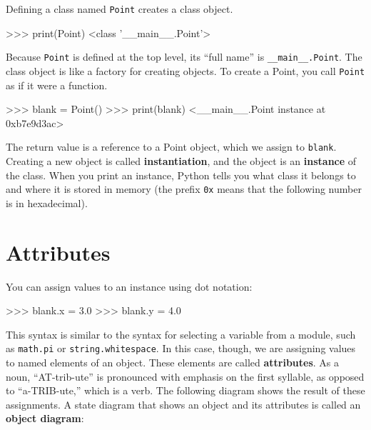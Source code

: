 
Defining a class named {\tt Point} creates a class object.

\beforeverb
\begin{pyinterpreter}
>>> print(Point)
<class '__main__.Point'>
\end{pyinterpreter}
\afterverb
%
Because {\tt Point} is defined at the top level, its ``full
name'' is \verb"__main__.Point".
%
%
The class object is like a factory for creating objects.  To create a
Point, you call {\tt Point} as if it were a function.

\beforeverb
\begin{pyinterpreter}
>>> blank = Point()
>>> print(blank)
<__main__.Point instance at 0xb7e9d3ac>
\end{pyinterpreter}
\afterverb
%
The return value is a reference to a Point object, which we
assign to {\tt blank}.  
Creating a new object is called
{\bf instantiation}, and the object is an {\bf instance} of
the class.
%
%
When you print an instance, Python tells you what class it
belongs to and where it is stored in memory (the prefix
{\tt 0x} means that the following number is in hexadecimal).



\section{Attributes}


You can assign values to an instance using dot notation:

\beforeverb
\begin{pyinterpreter}
>>> blank.x = 3.0
>>> blank.y = 4.0
\end{pyinterpreter}
\afterverb
%
This syntax is similar to the syntax for selecting a variable from a
module, such as {\tt math.pi} or {\tt string.whitespace}.  In this case,
though, we are assigning values to named elements of an object.
These elements are called {\bf attributes}.
%
As a noun, ``AT-trib-ute'' is pronounced with emphasis on the first
syllable, as opposed to ``a-TRIB-ute,'' which is a verb.
%
The following diagram shows the result of these assignments.
A state diagram that shows an object and its attributes is
called an {\bf object diagram}:


